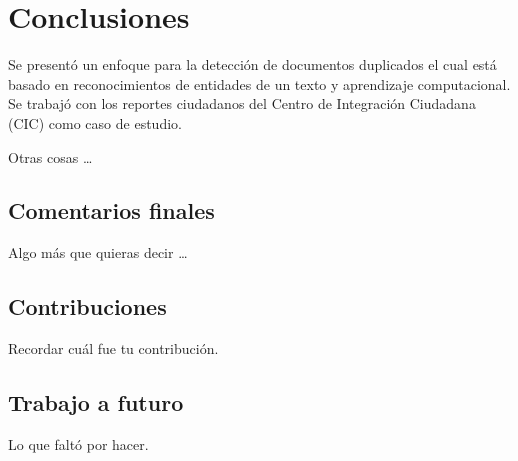 \chapter{Conclusiones}
\label{conclusiones}

Se present\'{o} un enfoque para la detecci\'{o}n de documentos duplicados el cual est\'{a} basado en reconocimientos de entidades de un texto y aprendizaje computacional. Se trabaj\'{o} con los reportes ciudadanos del Centro de Integraci\'{o}n Ciudadana (CIC) como caso de estudio.

Otras cosas \ldots

\section{Comentarios finales}

Algo m\'{a}s que quieras decir \ldots

\section{Contribuciones}

Recordar cu\'{a}l fue tu contribuci\'{o}n.

\section{Trabajo a futuro}

Lo que falt\'{o} por hacer.

\clearpage
